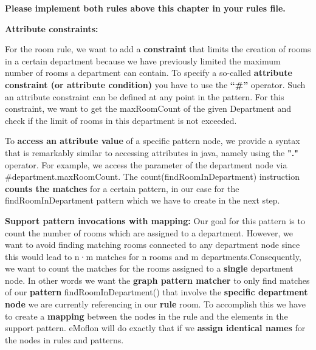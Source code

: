 \textbf{Please implement both rules above this chapter in your rules file.}\newline

\clearpage

\textbf{Attribute constraints:}

For the room rule, we want to add a \textbf{constraint} that limits the creation of rooms in a certain department because we have previously limited the maximum number of rooms a department can contain. To specify a so-called \textbf{attribute constraint (or attribute condition)} you have to use the \textbf{“\#”} operator. Such an attribute constraint can be defined at any point in the pattern. For this constraint, we want to get the \textsf{maxRoomCount} of the given Department and check if the limit of rooms in this department is not exceeded.

To \textbf{access an attribute value} of a specific pattern node, we provide a syntax that is remarkably similar to accessing attributes in java, namely using the \textbf{"."} operator.\newline
For example, we access the parameter of the department node via \textsf{\#department.maxRoomCount}. The \textsf{ count(findRoomInDepartment)} instruction \textbf{counts the matches} for a certain pattern, in our case for the \textsf{findRoomInDepartment} pattern which we have to create in the next step.\newline

\textbf{Support pattern invocations with mapping:}\newline
Our goal for this pattern is to count the number of rooms which are assigned to a department. However, we want to avoid finding matching rooms connected to any department node since this would lead to \textsf{n·m} matches for \textsf{n} rooms and \textsf{m} departments.\newline Consequently, we want to count the matches for the rooms assigned to a \textbf{single} department node. In other words we want the \textbf{graph pattern matcher} to only find matches of our \textbf{pattern} \textsf{findRoomInDepartment()} that involve the \textbf{specific department node} we are currently referencing in our \textbf{rule} \textsf{room}. To accomplish this we have to create a \textbf{mapping} between the nodes in the rule and the elements in the support pattern. eMoflon will do exactly that if we \textbf{assign identical names} for the nodes in rules and patterns.\newline


